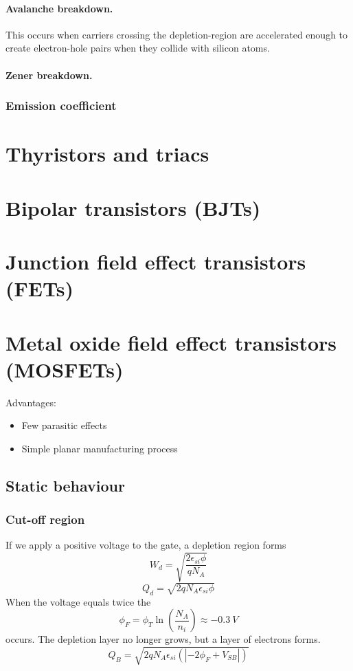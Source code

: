 \documentclass{report}
\begin{document}
\paragraph{Avalanche breakdown.} This occurs when carriers crossing the depletion-region are accelerated enough to create electron-hole pairs when they collide with silicon atoms.
\paragraph{Zener breakdown.}
\subsubsection{Emission coefficient}
\section{Thyristors and triacs}
\section{Bipolar transistors (BJTs)}
\section{Junction field effect transistors (FETs)}
\section{Metal oxide field effect transistors (MOSFETs)}
Advantages:
\begin{itemize}
\item Few parasitic effects
\item Simple planar manufacturing process
\end{itemize}
\subsection{Static behaviour}
\subsubsection{Cut-off region}
If we apply a positive voltage to the gate, a depletion region forms
\[ W_d = \sqrt{\frac{2\epsilon_{si}\phi}{qN_A}} \]
\[ Q_d = \sqrt{2qN_A\epsilon_{si}\phi} \]
When the voltage equals twice the 
\[ \phi_F = \phi_T \ln \left(\frac{N_A}{n_i}\right) \approx -\SI{0.3}{V} \]
 occurs. The depletion layer no longer grows, but a layer of electrons forms.
\[ Q_B = \sqrt{2qN_A\epsilon_{si}(|-2\phi_F + V_{SB}|)} \]
\end{document}
